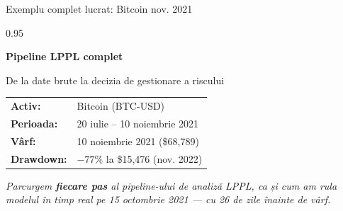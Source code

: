 \documentclass[9pt, aspectratio=169, t]{beamer}
\begin{document}
\begin{frame}{Exemplu complet lucrat: Bitcoin nov. 2021}
    \begin{cminipage}{0.95\textwidth}
    \begin{center}
        {\LARGE\color{MainBlue}\textbf{Pipeline LPPL complet}}

        \vspace{6mm}
        {\large De la date brute la decizia de gestionare a riscului}

        \vspace{6mm}
        {\footnotesize
        \begin{tabular}{ll}
            \textbf{Activ:} & Bitcoin (BTC-USD) \\
            \textbf{Perioada:} & 20 iulie -- 10 noiembrie 2021 \\
            \textbf{Vârf:} & 10 noiembrie 2021 (\$68{,}789) \\
            \textbf{Drawdown:} & $-77\%$ la \$15{,}476 (nov. 2022) \\
        \end{tabular}
        }

        \vspace{6mm}
        \textit{Parcurgem \textbf{fiecare pas} al pipeline-ului de analiză LPPL, ca și cum am rula modelul în timp real pe 15 octombrie 2021 --- cu 26 de zile înainte de vârf.}
    \end{center}
    \end{cminipage}
\end{frame}
\end{document}
